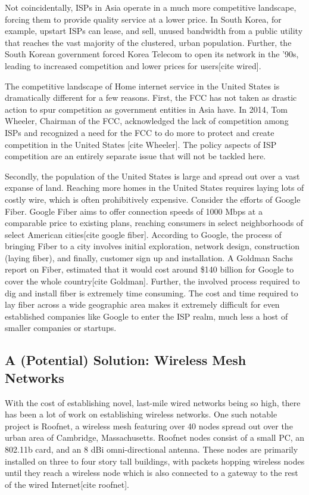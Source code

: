 \documentclass[pageno]{jpaper}
\begin{document}
Not coincidentally, ISPs in Asia operate in a much more competitive landscape, forcing them to provide quality service at a lower price. In South Korea, for example, upstart ISPs can lease, and sell, unused bandwidth from a public utility that reaches the vast majority of the clustered, urban population. Further, the South Korean government forced Korea Telecom to open its network in the '90s, leading to increased competition and lower prices for users[cite wired]. 

The competitive landscape of Home internet service in the United States is dramatically different for a few reasons. First, the FCC has not taken as drastic action to spur competition as government entities in Asia have. In 2014, Tom Wheeler, Chairman of the FCC, acknowledged the lack of competition among ISPs and recognized a need for the FCC to do more to protect and create competition in the United States [cite Wheeler]. The policy aspects of ISP competition are an entirely separate issue that will not be tackled here. 

Secondly, the population of the United States is large and spread out over a vast expanse of land. Reaching more homes in the United States requires laying lots of costly wire, which is often prohibitively expensive. Consider the efforts of Google Fiber. Google Fiber aims to offer connection speeds of 1000 Mbps at a comparable price to existing plans, reaching consumers in select neighborhoods of select American cities[cite google fiber]. According to Google, the process of bringing Fiber to a city involves initial exploration, network design, construction (laying fiber), and finally, customer sign up and installation. A Goldman Sachs report on Fiber, estimated that it would cost around \$140 billion for Google to cover the whole country[cite Goldman]. Further, the involved process required to dig and install fiber is extremely time consuming. The cost and time required to lay fiber across a wide geographic area makes it extremely difficult for even established companies like Google to enter the ISP realm, much less a host of smaller companies or startups.
\subsection{A (Potential) Solution: Wireless Mesh Networks}
With the cost of establishing novel, last-mile wired networks being so high, there has been a lot of work on establishing wireless networks. One such notable project is Roofnet, a wireless mesh featuring over 40 nodes spread out over the urban area of Cambridge, Massachusetts. Roofnet nodes consist of a small PC, an 802.11b card, and an 8 dBi omni-directional antenna. These nodes are primarily installed on three to four story tall buildings, with packets hopping wireless nodes until they reach a wireless node which is also connected to a gateway to the rest of the wired Internet[cite roofnet]. 
\end{document}
